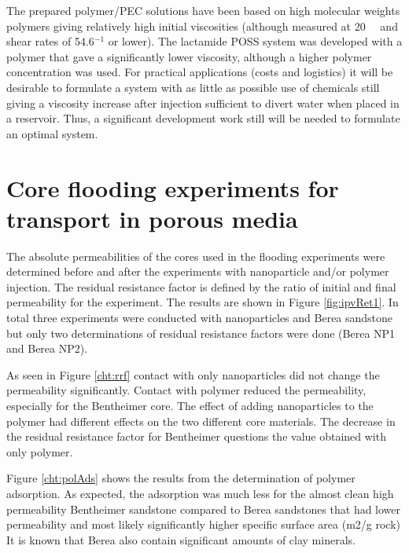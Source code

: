 The prepared polymer/PEC solutions have been based on high molecular weights polymers giving relatively high initial viscosities (although measured at 20~\celsius~ and shear rates of 54.6$^{-1}$ or lower). The lactamide POSS system was developed with a polymer that gave a significantly lower viscosity, although a higher polymer concentration was used. For practical applications (costs and logistics) it will be desirable to formulate a system with as little as possible use of chemicals still giving a viscosity increase after injection sufficient to divert water when placed in a reservoir. Thus, a significant development work still will be needed to formulate an optimal system.


\section{Core flooding experiments for transport in porous media}
The absolute permeabilities of the cores used in the flooding experiments were determined before and after the experiments with nanoparticle and/or polymer injection. The residual resistance factor is defined by the ratio of initial and final permeability for the experiment. The results are shown in Figure \ref{fig:ipvRet1}. In total three experiments were conducted with nanoparticles and Berea sandstone but only two determinations of residual resistance factors were done (Berea NP1 and Berea NP2).

As seen in Figure \ref{cht:rrf} contact with only nanoparticles did not change the permeability significantly. Contact with polymer reduced the permeability, especially for the Bentheimer core. The effect of adding nanoparticles to the polymer had different effects on the two different core materials. The decrease in the residual resistance factor for Bentheimer questions the value obtained with only polymer.

Figure \ref{cht:polAds} shows the results from the determination of polymer adsorption. As expected, the adsorption was much less for the almost clean high permeability Bentheimer sandstone compared to Berea sandstones that had lower permeability and most likely significantly higher specific surface area (m2/g rock) It is known that Berea also contain significant amounts of clay minerals.

